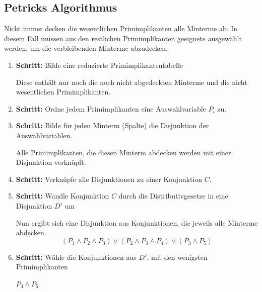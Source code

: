 \documentclass[12pt]{report}
\begin{document}
\subsection{Petricks Algorithmus}
Nicht immer decken die wesentlichen Primimplikanten alle Minterme ab. 
In diesem Fall müssen aus den restlichen Primimplikanten geeignete ausgewählt werden, 
um die verbleibenden Minterme abzudecken.


\begin{enumerate}
  \item \textbf{Schritt:} Bilde eine reduzierte Primimplikantentabelle

        Diese enthält nur noch die noch nicht abgedeckten Minterme und die nicht wesentlichen Primimplikanten.

  \item \textbf{Schritt:} Ordne jedem Primimplikanten eine Auswahlvariable $P_i$ zu.

  \item \textbf{Schritt:} Bilde für jeden Minterm (Spalte) die Disjunktion der Auswahlvariablen.

        Alle Primimplikanten, die diesen Minterm abdecken werden mit einer Disjunktion verknüpft.

  \item \textbf{Schritt:} Verknüpfe alle Disjunktionen zu einer Konjunktion $C$.

  \item \textbf{Schritt:} Wandle Konjunktion $C$ durch die Distributivgesetze in eine Disjunktion $D'$ um

        Nun ergibt sich eine Disjunktion aus Konjunktionen, die jeweils alle Minterme abdecken.
        $$(P_1 \wedge P_2 \wedge P_3) \vee (P_2 \wedge P_3 \wedge P_4) \vee (P_3 \wedge P_5)$$

  \item \textbf{Schritt:} Wähle die Konjunktionen aus $D'$, mit den wenigsten Primimplikanten

        $P_3 \wedge P_5$

\end{enumerate}
\end{document}
